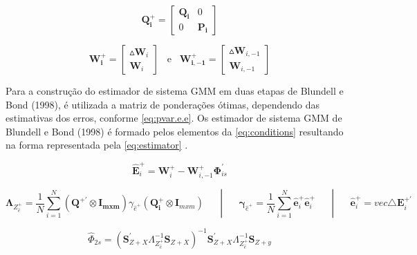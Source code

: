 \documentclass[
  12pt,
  12pt,
  openright,
  oneside,
  a4paper,
  chapter=TITLE,
  section=TITLE,
  subsection=TITLE,
  subsubsection=TITLE,
  english,
  portugues,
  sumario=tradicional]{abntex2}
\begin{document}
\begin{equation}\label{eq:pvar.instr}
\mathbf{Q^{+}_{i}} = \left[\begin{array}{cc}
\mathbf{Q_{i}} & 0 \\
0 & \mathbf{P_{i}}
\end{array}\right]
\end{equation}

\begin{equation}\label{eq:pvar.gdata}
\mathbf{W^{+}_{i}} = \left[\begin{array}{c}
\vartriangle\mathbf{W}_{i}  \\
\mathbf{W}_{i} 
\end{array}\right]\hspace{10pt}\text{e}\hspace{10pt}\mathbf{W^{+}_{i, -1}} = \left[\begin{array}{c}
\vartriangle\mathbf{W}_{i,-1}  \\
\mathbf{W}_{i,-1} 
\end{array}\right]
\end{equation}

Para a construção do estimador de sistema GMM em duas etapas de Blundell e Bond (1998), é utilizada a matriz de ponderações ótimas, dependendo das estimativas dos erros, conforme \autoref{eq:pvar.e.e}. Os estimador de sistema GMM de Blundell e Bond (1998) é formado pelos elementos da \autoref{eq:conditions} resultando na forma representada pela \autoref{eq:estimator} \cite{sigmund:2008}.

\begin{equation}\label{eq:pvar.e.e}
\mathbf{\hat{E}}_{i}^{+} = \mathbf{W}_{i}^{+} - \mathbf{W}_{i,-1}^{+}\mathbf{\Phi}_{is}^{'} 
\end{equation}

\begin{equation}\label{eq:conditions}\mathbf{\Lambda}_{Z^{+}_{\hat{e}}} = \frac{1}{N}\sum_{i = 1}^{N}(\mathbf{Q^{+'}}\otimes\mathbf{I_{m x m}})\gamma_{\hat{e}^{+}}(\mathbf{Q_{i}^{+}}\otimes\mathbf{I}_{mxm})\hspace{20pt} |  \hspace{20pt}\mathbf{\gamma}_{\hat{e}^{+}} = \frac{1}{N}\sum_{i=1}^{N} \mathbf{\hat{e}}_{i}^{+} \mathbf{\hat{e}}_{i}^{+} \hspace{20pt} |  \hspace{20pt}\mathbf{\hat{e}}_{i}^{+} = vec{\triangle\mathbf{E}_{i}^{+'}} 
\end{equation}

\begin{equation}\label{eq:estimator}
\hat{\Phi}_{2s} =  (\mathbf{S}^{'}_{Z+X} \Lambda^{-1}_{Z^{+}_{\hat{e}}}\mathbf{S}_{Z+X})^{-1} \mathbf{S}^{'}_{Z+X} \Lambda^{-1}_{Z^{+}_{\hat{e}}}\mathbf{S}_{Z+y}
\end{equation}
\end{document}
